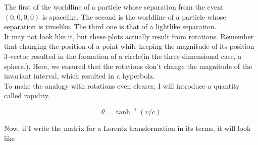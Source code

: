 \documentclass[12pt]{article}
\begin{document}

The first of the worldline of a particle whose separation from the event $(0,0,0,0)$ is spacelike. The second is the worldline of a particle 
whose separation is timelike. The third one is that of a lightlike separation. \\
It may not look like it, but these plots actually result from rotations. Remember that changing the position of a point while keeping the magnitude of its position 3-vector resulted in the formation of a circle(in the three dimensional case, a sphere.).
Here, we ensured that the rotations don't change the magnitude of the invariant interval, which resulted in a hyperbola. \\
To make the analogy with rotations even clearer, I will introduce a quantity called rapidity. 

\[\theta = \tanh^{-1}(v/c)\]

Now, if I write the matrix for a Lorentz transformation in its terms, it will look like 
\end{document}
